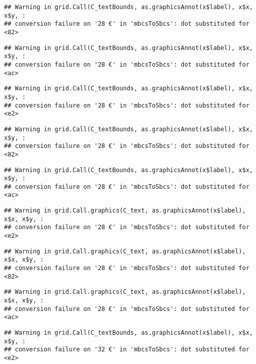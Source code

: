\documentclass[
]{article}
\begin{document}
\begin{verbatim}
## Warning in grid.Call(C_textBounds, as.graphicsAnnot(x$label), x$x, x$y, :
## conversion failure on '28 €' in 'mbcsToSbcs': dot substituted for <82>
\end{verbatim}

\begin{verbatim}
## Warning in grid.Call(C_textBounds, as.graphicsAnnot(x$label), x$x, x$y, :
## conversion failure on '28 €' in 'mbcsToSbcs': dot substituted for <ac>
\end{verbatim}

\begin{verbatim}
## Warning in grid.Call(C_textBounds, as.graphicsAnnot(x$label), x$x, x$y, :
## conversion failure on '28 €' in 'mbcsToSbcs': dot substituted for <e2>
\end{verbatim}

\begin{verbatim}
## Warning in grid.Call(C_textBounds, as.graphicsAnnot(x$label), x$x, x$y, :
## conversion failure on '28 €' in 'mbcsToSbcs': dot substituted for <82>
\end{verbatim}

\begin{verbatim}
## Warning in grid.Call(C_textBounds, as.graphicsAnnot(x$label), x$x, x$y, :
## conversion failure on '28 €' in 'mbcsToSbcs': dot substituted for <ac>
\end{verbatim}

\begin{verbatim}
## Warning in grid.Call.graphics(C_text, as.graphicsAnnot(x$label), x$x, x$y, :
## conversion failure on '28 €' in 'mbcsToSbcs': dot substituted for <e2>
\end{verbatim}

\begin{verbatim}
## Warning in grid.Call.graphics(C_text, as.graphicsAnnot(x$label), x$x, x$y, :
## conversion failure on '28 €' in 'mbcsToSbcs': dot substituted for <82>
\end{verbatim}

\begin{verbatim}
## Warning in grid.Call.graphics(C_text, as.graphicsAnnot(x$label), x$x, x$y, :
## conversion failure on '28 €' in 'mbcsToSbcs': dot substituted for <ac>
\end{verbatim}

\begin{verbatim}
## Warning in grid.Call(C_textBounds, as.graphicsAnnot(x$label), x$x, x$y, :
## conversion failure on '32 €' in 'mbcsToSbcs': dot substituted for <e2>
\end{verbatim}
\end{document}
